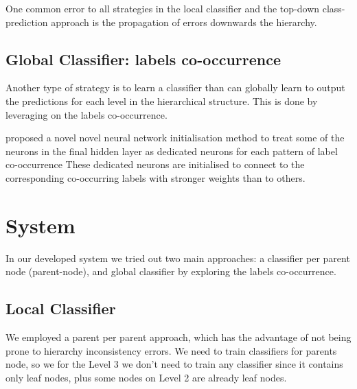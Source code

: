 \documentclass[11pt,a4paper]{article}
\begin{document}
One common error to all strategies in the local classifier and the top-down class-prediction
approach is the propagation of errors downwards the hierarchy.



\subsection{Global Classifier: labels co-occurrence}

Another type of strategy is to learn a classifier than can globally learn to output the predictions
for each level in the hierarchical structure. This is done by leveraging on the labels co-occurrence.

\citet{kurata-etal-2016-improved} proposed a novel novel neural network initialisation method to
treat some of the neurons in the final hidden layer as dedicated neurons for each pattern of label
co-occurrence These dedicated neurons are initialised to connect to the corresponding co-occurring
labels with stronger weights than to others.


\begin{comment}
When the labels form a hi- erarchy, they share a hypernym–hyponym relation (Figure 1). When multiple labels are assigned to the text, if it is explicitly labeled by a subclass it must also implicitly include all of the its super- classes.
The co-occurrence between subclasses and su- perclasses as labels for the input text contains in- formation we would like to leverage to improve multi-label classification using a neural network.
\end{comment}






\section{System}\label{system}

In our developed system we tried out two main approaches: a classifier per
parent node (parent-node), and global classifier by exploring the
labels co-occurrence.



\subsection{Local Classifier}

We employed a parent per parent approach, which has the advantage of not being
prone to hierarchy inconsistency errors. We need to train classifiers for
parents node, so we for the Level 3 we don't need to train any classifier
since it contains only leaf nodes, plus some nodes on Level 2 are already leaf
nodes.
\end{document}
